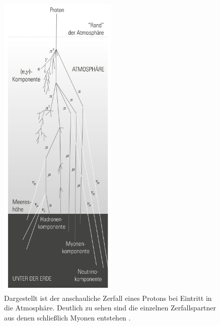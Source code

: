 \begin{figure}
    \centering
    \includegraphics[width=0.5\textwidth]{bilder/zerfall.png}
    \caption{Dargestellt ist der anschauliche Zerfall eines Protons bei Eintritt in die Atmosphäre. 
            Deutlich zu sehen sind die einzelnen Zerfallspartner aus denen schließlich Myonen entstehen \cite{einfuehrung}.}
    \label{ehhnicht}
\end{figure}


